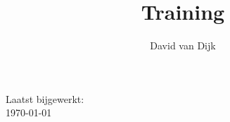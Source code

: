 \documentclass[11pt]{article}
\title{Training \customer \\ \customerdomainuc}
\author{David van Dijk}
\date{}
\begin{document}
\maketitle
\begin{center}

Laatst bijgewerkt: \\ \ddmmyyyydate \today
\end{center}
\pagebreak

\renewcommand*\contentsname{Inhoudsopgave}
\tableofcontents
\pagebreak


\clearpage
\end{document}
